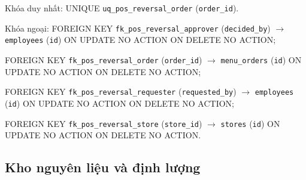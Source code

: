 \begin{description}[leftmargin=3.6cm,labelwidth=3.4cm,style=nextline]
Khóa duy nhất: UNIQUE \texttt{uq\_pos\_reversal\_order} (\texttt{order\_id}).

Khóa ngoại: FOREIGN KEY \texttt{fk\_pos\_reversal\_approver} (\texttt{decided\_by}) $\rightarrow$ \texttt{employees} (\texttt{id}) ON UPDATE NO ACTION ON DELETE NO ACTION;\par FOREIGN KEY \texttt{fk\_pos\_reversal\_order} (\texttt{order\_id}) $\rightarrow$ \texttt{menu\_orders} (\texttt{id}) ON UPDATE NO ACTION ON DELETE NO ACTION;\par FOREIGN KEY \texttt{fk\_pos\_reversal\_requester} (\texttt{requested\_by}) $\rightarrow$ \texttt{employees} (\texttt{id}) ON UPDATE NO ACTION ON DELETE NO ACTION;\par FOREIGN KEY \texttt{fk\_pos\_reversal\_store} (\texttt{store\_id}) $\rightarrow$ \texttt{stores} (\texttt{id}) ON UPDATE NO ACTION ON DELETE NO ACTION.

\end{description}

\subsection{Kho nguyên liệu và định lượng}


